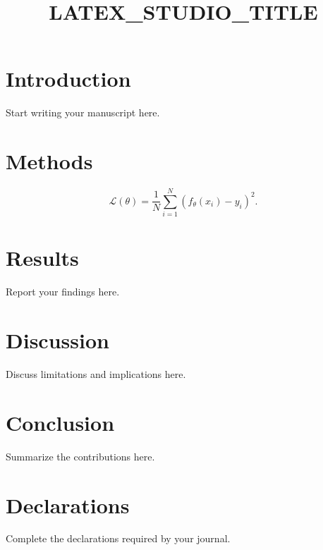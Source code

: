 \documentclass[pdflatex,sn-vancouver-num]{sn-jnl}
\begin{document}
\title{LATEX_STUDIO_TITLE}
\author*[1]{ }
\maketitle

\section{Introduction}
Start writing your manuscript here.

\section{Methods}
\begin{equation}
  \mathcal{L}(\theta) = \frac{1}{N}\sum_{i=1}^{N}(f_\theta(x_i)-y_i)^2.
  \label{eq:objective}
\end{equation}

\section{Results}
Report your findings here.

\section{Discussion}
Discuss limitations and implications here.

\section{Conclusion}
Summarize the contributions here.

\section*{Declarations}
Complete the declarations required by your journal.
% 
\end{document}
